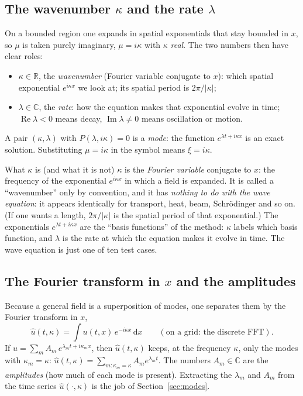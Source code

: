 \documentclass[11pt,a4paper]{article}
\theoremstyle{definition}
\newcommand{\R}{\mathbb{R}}\newcommand{\C}{\mathbb{C}}\newcommand{\N}{\mathbb{N}}\newcommand{\Z}{\mathbb{Z}}
\newcommand{\dd}{\,\mathrm{d}}
\begin{document}
\subsection{The wavenumber $\kappa$ and the rate $\lambda$}
On a bounded region one expands in spatial exponentials that stay bounded in $x$, so $\mu$ is taken purely imaginary, $\mu=i\kappa$ with $\kappa$ \emph{real}. The two numbers then have clear roles:
\begin{itemize}[nosep]
\item $\kappa\in\R$, the \emph{wavenumber} (Fourier variable conjugate to $x$): which spatial exponential $e^{i\kappa x}$ we look at; its spatial period is $2\pi/|\kappa|$;
\item $\lambda\in\C$, the \emph{rate}: how the equation makes that exponential evolve in time; $\operatorname{Re}\lambda<0$ means decay, $\operatorname{Im}\lambda\neq0$ means oscillation or motion.
\end{itemize}
A pair $(\kappa,\lambda)$ with $P(\lambda,i\kappa)=0$ is a \emph{mode}: the function $e^{\lambda t+i\kappa x}$ is an exact solution. Substituting $\mu=i\kappa$ in the symbol means $\xi=i\kappa$.

\begin{notebox}{What $\kappa$ is (and what it is not)}
$\kappa$ is the \emph{Fourier variable} conjugate to $x$: the frequency of the exponential $e^{i\kappa x}$ in which a field is expanded. It is called a ``wavenumber'' only by convention, and it has \emph{nothing to do with the wave equation}: it appears identically for transport, heat, beam, Schr\"odinger and so on. (If one wants a length, $2\pi/|\kappa|$ is the spatial period of that exponential.) The exponentials $e^{\lambda t+i\kappa x}$ are the ``basis functions'' of the method: $\kappa$ labels which basis function, and $\lambda$ is the rate at which the equation makes it evolve in time. The wave equation is just one of ten test cases.
\end{notebox}

\subsection{The Fourier transform in $x$ and the amplitudes}
Because a general field is a superposition of modes, one separates them by the Fourier transform in $x$,
\[
\hat u(t,\kappa)=\int u(t,x)\,e^{-i\kappa x}\dd x\qquad(\text{on a grid: the discrete FFT}).
\]
If $u=\sum_mA_m\,e^{\lambda_mt+i\kappa_mx}$, then $\hat u(t,\kappa)$ keeps, at the frequency $\kappa$, only the modes with $\kappa_m=\kappa$: $\hat u(t,\kappa)=\sum_{m:\kappa_m=\kappa}A_me^{\lambda_mt}$. The numbers $A_m\in\C$ are the \emph{amplitudes} (how much of each mode is present). Extracting the $\lambda_m$ and $A_m$ from the time series $\hat u(\cdot,\kappa)$ is the job of Section~\ref{sec:modes}.
\end{document}
